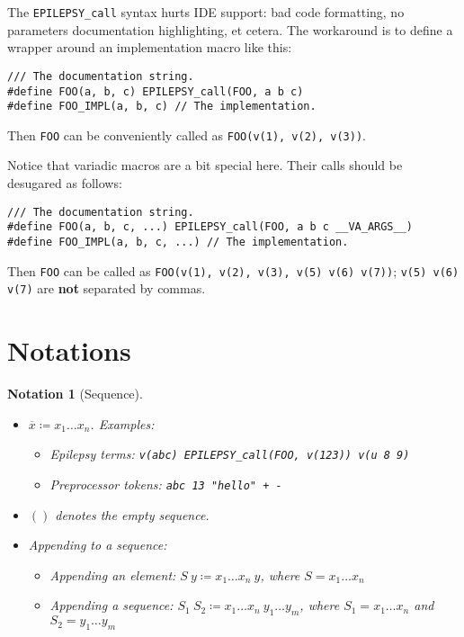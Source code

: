 \documentclass[12pt]{article}
\theoremstyle{break}
\newtheorem{notation}{Notation}
\begin{document}
The \texttt{EPILEPSY\_call} syntax hurts IDE support: bad code formatting, no parameters
documentation highlighting, et cetera. The workaround is to define a wrapper around
an implementation macro like this:

\begin{verbatim}
/// The documentation string.
#define FOO(a, b, c) EPILEPSY_call(FOO, a b c)
#define FOO_IMPL(a, b, c) // The implementation.
\end{verbatim}

Then \texttt{FOO} can be conveniently called as \texttt{FOO(v(1), v(2), v(3))}.

Notice that variadic macros are a bit special here. Their calls should be desugared as follows:

\begin{verbatim}
/// The documentation string.
#define FOO(a, b, c, ...) EPILEPSY_call(FOO, a b c __VA_ARGS__)
#define FOO_IMPL(a, b, c, ...) // The implementation.
\end{verbatim}

Then \texttt{FOO} can be called as \texttt{FOO(v(1), v(2), v(3), v(5) v(6) v(7))};
\texttt{v(5) v(6) v(7)} are \textbf{not} separated by commas.

\section{Notations}

\begin{notation}[Sequence]
    \begin{itemize}
        \item $\overline{x} \coloneqq x_1 \ldots x_n$. Examples:
        \begin{itemize}
            \item Epilepsy terms: \texttt{v(abc) EPILEPSY\_call(FOO, v(123)) v(u 8 9)}
            \item Preprocessor tokens: \texttt{abc 13 "hello" + -}
        \end{itemize}
        \item $()$ denotes the empty sequence.
        \item Appending to a sequence:
        \begin{itemize}
            \item Appending an element: $S \ y \coloneqq x_1 \ldots x_n \ y$, where $S = x_1 \ldots x_n$
            \item Appending a sequence: $S_1 \ S_2 \coloneqq x_1 \ldots x_n \ y_1 \ldots y_m$, where $S_1 = x_1 \ldots x_n$
            and $S_2 = y_1 \ldots y_m$
        \end{itemize}
    \end{itemize}
\end{notation}
\end{document}
